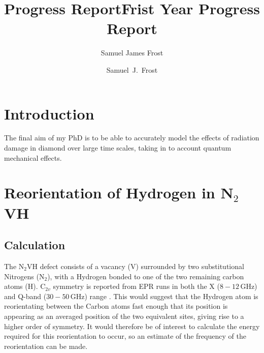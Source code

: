 \documentclass[10pt,a4paper,twocolumn,twoside]{extarticle}
\title{Progress Report}
\author{Samuel James Frost}
\title{Frist Year Progress Report}
\author{Samuel~J.~Frost}
\newcommand{\ntvh}{N$_2$VH }
\begin{document}
	\thispagestyle{empty}
	\tableofcontents

	
\section{Introduction}
The final aim of my PhD is to be able to accurately model the effects of radiation damage in diamond over large time scales, taking in to account quantum mechanical effects.

\section{Reorientation of Hydrogen in N$_2$VH}
\subsection{Calculation}
\label{n2vh_calc}
The \ntvh defect consists of a vacancy (V) surrounded by two substitutional Nitrogens (N$_2$), with a Hydrogen bonded to one of the two remaining carbon atoms (H). C$_{2v}$ symmetry is reported from EPR runs in both the X ($8-12$\,GHz) and Q-band ($30-50$\,GHz) range \cite{Hartland}. This would suggest that the Hydrogen atom is reorientating between the Carbon atoms fast enough that its position is appearing as an averaged position of the two equivalent sites, giving rise to a higher order of symmetry. It would therefore be of interest to calculate the energy required for this reorientation to occur, so an estimate of the frequency of the reorientation can be made. 
\end{document}
